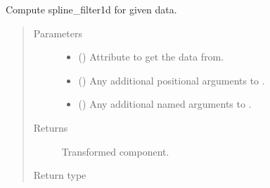 \documentclass[letterpaper,10pt,english]{sphinxmanual}
\begin{document}
\begin{fulllineitems}
\begin{fulllineitems}
\label{\detokenize{api/rock:geology.src.Rock.spline_filter1d}}
Compute spline\_filter1d for given data.
\begin{quote}\begin{description}
\item[{Parameters}] \leavevmode\begin{itemize}
\item {} 
 (\sphinxstyleliteralemphasis{\sphinxupquote{, }}) \textendash{} Attribute to get the data from.

\item {} 
 () \textendash{} Any additional positional arguments to .

\item {} 
 () \textendash{} Any additional named arguments to .

\end{itemize}

\item[{Returns}] \leavevmode
{} \textendash{} Transformed component.

\item[{Return type}] \leavevmode
{\hyperref[\detokenize{api/base_classes:geology.src.base_spatial.SpatialComponent}]{}}

\end{description}\end{quote}

\end{fulllineitems}



\end{fulllineitems}
\end{document}
